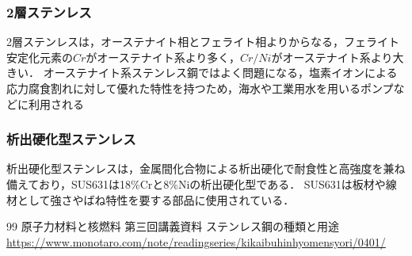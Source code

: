 \documentclass[titlepage,a4paper]{jsarticle}
\begin{document}
\subsubsection{2層ステンレス}
2層ステンレスは，オーステナイト相とフェライト相よりからなる，フェライト安定化元素の$Cr$がオーステナイト系より多く，$Cr/ Ni$がオーステナイト系より大きい．
オーステナイト系ステンレス鋼ではよく問題になる，塩素イオンによる応力腐食割れに対して優れた特性を持つため，海水や工業用水を用いるポンプなどに利用される
\subsubsection{析出硬化型ステンレス}
析出硬化型ステンレスは，金属間化合物による析出硬化で耐食性と高強度を兼ね備えており，SUS631は18\%Crと8\%Niの析出硬化型である．
SUS631は板材や線材として強さやばね特性を要する部品に使用されている．

\begin{thebibliography}{99}
\bibitem{} 原子力材料と核燃料 第三回講義資料
\bibitem{} ステンレス鋼の種類と用途 \url{https://www.monotaro.com/note/readingseries/kikaibuhinhyomensyori/0401/}
\end{thebibliography}
\end{document}

